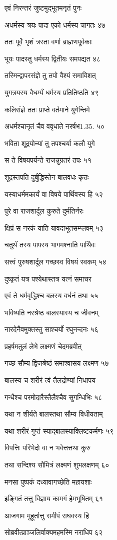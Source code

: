 एवं निरन्तरं जुष्टमुद्भूतमनृतं पुनः

अधर्मस्य त्रयः पादा एको धर्मस्य चागतः ४७

ततः पूर्वे भृशं त्रस्ता वर्णा ब्राह्मणपूर्वकाः

भूयः पादस्तु धर्मस्य द्वितीयः समपद्यत ४८

तस्मिन्द्वापरसंज्ञे तु तपो वैश्यं समाविशत्

युगत्रयस्य वैधर्म्यं धर्मस्य प्रतितिष्ठति ४९

कलिसंज्ञे ततः प्राप्ते वर्तमाने युगेन्तिमे

अधर्मश्चानृतं चैव ववृधाते नरर्षभ1.35. ५०

भविता शूद्रयोन्यां तु तपश्चर्या कलौ युगे

स ते विषयपर्यन्ते राजन्नुग्रतरं तपः ५१

शूद्रस्तपति दुर्बुद्धिस्तेन बालवधः कृतः

यस्याधर्ममकार्यं वा विषये पार्थिवस्य हि ५२

पुरे वा राजशार्दूल कुरुते दुर्मतिर्नरः

क्षिप्रं स नरकं याति यावदाभूतसम्प्लवम् ५३

चतुर्थं तस्य पापस्य भागमश्नाति पार्थिवः

सत्त्वं पुरुषशार्दूल गच्छस्व विषयं स्वकम् ५४

दुष्कृतं यत्र पश्येथास्तत्र यत्नं समाचर

एवं ते धर्मवृद्धिश्च बलस्य वर्धनं तथा ५५

भविष्यति नरश्रेष्ठ बालस्यास्य च जीवनम्

नारदेनैवमुक्तस्तु साश्चर्यो रघुनन्दनः ५६

प्रहर्षमतुलं लेभे लक्ष्मणं चेदमब्रवीत्

गच्छ सौम्य द्विजश्रेष्ठं समाश्वासय लक्ष्मण ५७

बालस्य च शरीरं त्वं तैलद्रोण्यां निधापय

गन्धैश्च परमोदारैस्तैलैश्चैव सुगन्धिभिः ५८

यथा न शीर्यते बालस्तथा सौम्य विधीयताम्

यथा शरीरं गुप्तं स्याद्बालस्याक्लिष्टकर्मणः ५९

विपत्तिः परिभेदो वा न भवेत्तत्तथा कुरु

तथा सन्दिश्य सौमित्रं लक्ष्मणं शुभलक्षणम् ६०

मनसा पुष्पकं दध्यावागच्छेति महायशाः

इङ्गितं तत्तु विज्ञाय कामगं हेमभूषितम् ६१

आजगाम मुहूर्तात्तु समीपं राघवस्य हि

सोब्रवीत्प्राञ्जलिर्वाक्यमहमस्मि नराधिप ६२

